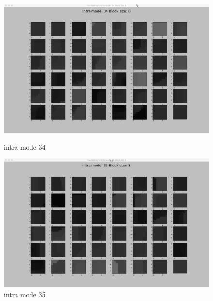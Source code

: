 \begin{figure}[H]
    \vspace*{1cm} %
    \begin{minipage}{0.49\textwidth}
        \includegraphics[width=\linewidth]{Figures/visu-size8x8/8-34}
        \caption[Intra mode 34]{intra mode 34.}
        \label{fig:size8_mode34}
    \end{minipage}
    \hspace{\fill} %
    \begin{minipage}{0.49\textwidth}
        \includegraphics[width=\linewidth]{Figures/visu-size8x8/8-35}
        \caption[Intra mode 35]{intra mode 35.}
        \label{fig:size8_mode35}
    \end{minipage}
    \vspace*{1cm} %
    \begin{minipage}{0.49\textwidth}

\end{minipage}
\end{figure}
